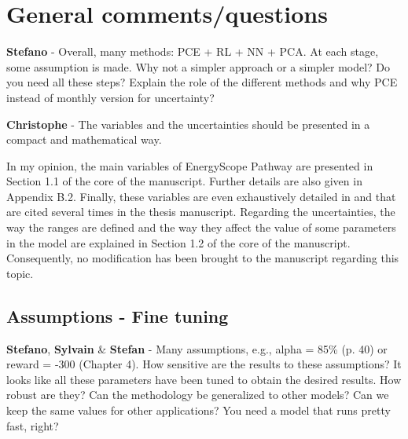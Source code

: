 \documentclass[12pt,a4paper]{article}
\begin{document}
\section{General comments/questions}
\label{General}

\begin{mdframed}[style=comment] %
{\color{orange} \textbf{Stefano}} - Overall, many methods: PCE + RL + NN + PCA. At each stage, some assumption is made. Why not a simpler approach or a simpler model? Do you need all these steps? Explain the role of the different methods and why PCE instead of monthly version for uncertainty? 
\end{mdframed}

\noindent

\begin{mdframed}[style=manuscript] %

\end{mdframed}

\begin{mdframed}[style=comment] %
{\color{violet} \textbf{Christophe}} - The variables and the uncertainties should be presented in a compact and mathematical way.
\end{mdframed}

\noindent In my opinion, the main variables of EnergyScope Pathway are presented {\color{blue} in Section 1.1 of the core of the manuscript}. Further details are also given {\color{blue}in Appendix B.2}. Finally, these variables are even exhaustively detailed in \cite{limpens2019energyscope} and \cite{limpens2024pathway} that are cited several times in the thesis manuscript.  Regarding the uncertainties, the way the ranges are defined and the way they affect the value of some parameters in the model are explained {\color{blue}in Section 1.2 of the core of the manuscript}. Consequently, no modification has been brought to the manuscript regarding this topic.

\subsection{Assumptions - Fine tuning}
\label{fine_tuning}

\begin{mdframed}[style=comment] %
{\color{orange} \textbf{Stefano}}, {\color{purple} \textbf{Sylvain}} \& {\color{teal} \textbf{Stefan}} - Many assumptions, e.g., alpha = 85\% (p. 40) or reward = -300 (Chapter 4). How sensitive are the results to these assumptions? It looks like all these parameters have been tuned to obtain the desired results. How robust are they? Can the methodology be generalized to other models? Can we keep the same values for other applications? You need a model that runs pretty fast, right?
\end{mdframed}
\end{document}
